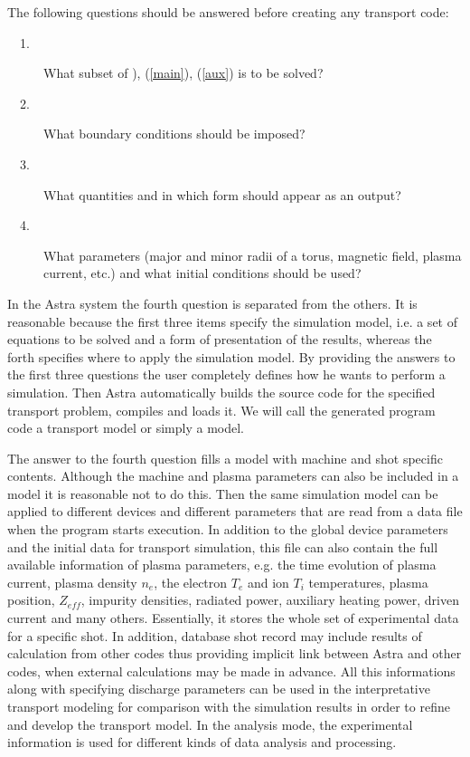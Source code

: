 The following questions should be answered before creating any transport
code:
\begin{description}
\item[\ \ 1.] What subset of \eqs{\ref{GSp}}), (\ref{main}), (\ref{aux}) is
to be solved?
\item[\ \ 2.] What boundary conditions should be imposed?
\item[\ \ 3.] What quantities and in which form should appear as an output?
\item[\ \ 4.] What parameters (major and minor radii of a torus, magnetic
field, plasma current, etc.) and what initial conditions should be used?
\end{description}
\nopagebreak
In the Astra system the fourth question is separated from the others.
It is reasonable because the first three items specify the simulation
model, i.e. a set of equations to be solved and a form of presentation
of the results, whereas the forth specifies where to apply the
simulation model. 
By providing the answers to the first three questions the user completely
defines how he wants to perform a simulation.
Then Astra automatically builds the source code for the specified transport
problem, compiles and loads it.
We will call the generated program code a transport model or simply a
model.

The answer to the fourth question fills a model with machine and shot
specific contents.
Although the machine and plasma parameters can also be included in a
model it is reasonable not to do this.
Then the same simulation model can be applied to different devices and
different parameters that are read from a data file when the program
starts execution. 
In addition to the global device parameters and the initial data for
transport simulation, this file can also contain the full available
information of plasma parameters, e.g. the time evolution of plasma
current, plasma density $n_e$, the electron $T_e$ and ion $T_i$
temperatures, plasma position, $Z_{eff}$, impurity densities, radiated
power, auxiliary heating power, driven current and many others. 
Essentially, it stores the whole set of experimental data for a specific
shot.
In addition, database shot record may include results of calculation from
other codes thus providing implicit link between Astra and other codes,
when external calculations may be made in advance.
All this informations along with specifying discharge parameters can be used
in the interpretative transport modeling for comparison with the simulation
results in order to refine and develop the transport model.
In the analysis mode, the experimental information is used for different
kinds of data analysis and processing.

